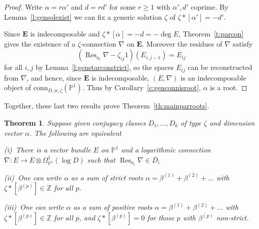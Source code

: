 \documentclass{amsart}
\theoremstyle{plain}
\newtheorem{thm}{Theorem}[section]
\theoremstyle{definition}
\theoremstyle{remark}
\newcommand{\Z}{\mathbb{Z}}
\newcommand{\PP}{\mathbb{P}}
\DeclareMathOperator{\Res}{Res}
\newcommand{\E}{\mathbf{E}}
\begin{document}
\begin{proof}
Write $\alpha = r\alpha'$ and $d=rd'$ for some $r\ge 1$ with $\alpha',d'$ coprime.
By Lemma~\ref{l:gensolexist} we can fix a generic solution $\zeta$ of $\zeta*[\alpha']=-d'$.

Since $\mathbf{E}$ is indecomposable and $\zeta*[\alpha]=-d=-\deg E$,
Theorem~\ref{t:parcon} gives the existence of a $\zeta$-connection $\nabla$ on $\E$.
Moreover the residues of $\nabla$ satisfy
\[
(\Res_{a_i}\nabla - \zeta_{ij}1)(E_{i,j-1}) = E_{ij}
\]
for all $i,j$ by Lemma~\ref{l:genstarconstrict},
so the spaces $E_{ij}$ can be reconstructed from $\nabla$, and
hence, since $\E$ is indecomposable, $(E,\nabla)$ is an indecomposable
object of $\mathrm{conn}_{D,w,\zeta}(\PP^1)$.
Thus by Corollary~\ref{c:genconnisroot}, $\alpha$ is a root.
\end{proof}


Together, these last two results prove Theorem~\ref{th:mainparroots}.


\begin{thm}\label{t:conncccexist}
Suppose given conjugacy classes $D_1,\dots,D_k$ of type $\zeta$ and dimension vector $\alpha$.
The following are equivalent

\textup{\hphantom{ii}(i)}~There is a vector bundle $E$ on $\PP^1$ and a logarithmic connection $\nabla:E\to E\otimes \Omega^1_{\PP^1}(\log D)$
such that $\Res_{a_i}\nabla \in \overline{D_i}$

\textup{\hphantom{i}(ii)}~One can write $\alpha$ as a sum of strict roots $\alpha=\beta^{(1)}+\beta^{(2)}+\dots$ with
$\zeta*[\beta^{(p)}]\in\Z$ for all $p$.

\textup{(iii)}~One can write $\alpha$ as a sum of positive roots $\alpha=\beta^{(1)}+\beta^{(2)}+\dots$ with
$\zeta*[\beta^{(p)}]\in\Z$ for all $p$, and $\zeta*[\beta^{(p)}]=0$ for those $p$ with
$\beta^{(p)}$ non-strict.
\end{thm}
\end{document}
